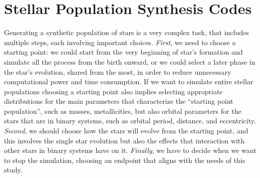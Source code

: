 \section{Stellar Population Synthesis Codes}
Generating a synthetic population of stars is a very complex task, that includes multiple steps, each involving important choices.
\textit{First}, we need to choose a starting point: we could start from the very beginning of star's formation and simulate all the process from the birth onward, or we could select a later phase in the star's evolution, shared from the most, in order to reduce unnecessary computational power and time consumption. 
If we want to simulate entire stellar populations choosing a starting point also implies selecting appropriate distributions for the main parameters that characterize the ``starting point population'', such as masses, metallicities, but also orbital parameters for the stars that are in binary systems, such as orbital period, distance, and eccentricity. 
\textit{Second}, we should choose how the stars will evolve from the starting point, and this involves the single star evolution but also the effects that interaction with other stars in binary systems have on it.
\textit{Finally}, we have to decide when we want to stop the simulation, choosing an endpoint that aligns with the needs of this study.

